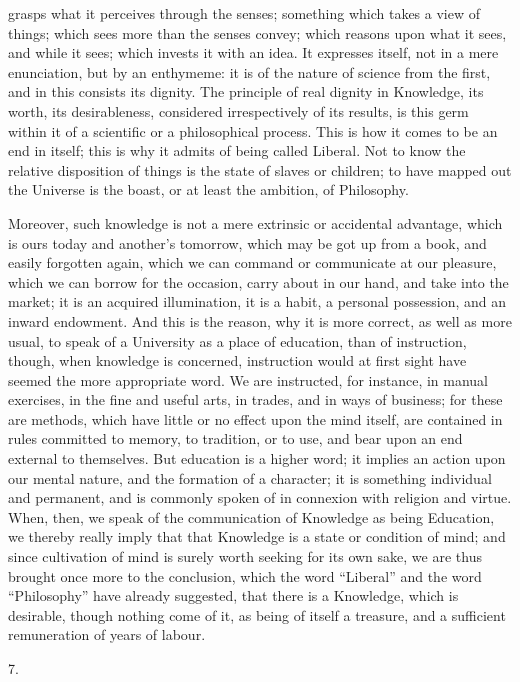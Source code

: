grasps what it perceives through the senses; something which takes a
view of things; which sees more than the senses convey; which reasons
upon what it sees, and while it sees; which invests it with an idea.
It expresses itself, not in a mere enunciation, but by an enthymeme:
it is of the nature of science from the first, and in this consists
its dignity. The principle of real dignity in Knowledge, its worth,
its desirableness, considered irrespectively of its results, is this
germ within it of a scientific or a philosophical process. This is how
it comes to be an end in itself; this is why it admits of being called
Liberal. Not to know the relative disposition of things is the state
of slaves or children; to have mapped out the Universe is the boast,
or at least the ambition, of Philosophy.

Moreover, such knowledge is not a mere extrinsic or accidental
advantage, which is ours today and another's tomorrow, which may be
got up from a book, and easily forgotten again, which we can command
or communicate at our pleasure, which we can borrow for the occasion,
carry about in our hand, and take into the market; it is an acquired
illumination, it is a habit, a personal possession, and an inward
endowment. And this is the reason, why it is more correct, as well as
more usual, to speak of a University as a place of education, than of
instruction, though, when knowledge is concerned, instruction would at
first sight have seemed the more appropriate word. We are instructed,
for instance, in manual exercises, in the fine and useful arts, in
trades, and in ways of business; for these are methods, which have
little or no effect upon the mind itself, are contained in rules
committed to memory, to tradition, or to use, and bear upon an
end external to themselves. But education is a higher word; it implies
an action upon our mental nature, and the formation of a character; it
is something individual and permanent, and is commonly spoken of in
connexion with religion and virtue. When, then, we speak of the
communication of Knowledge as being Education, we thereby really imply
that that Knowledge is a state or condition of mind; and since
cultivation of mind is surely worth seeking for its own sake, we are
thus brought once more to the conclusion, which the word
``Liberal'' and the word ``Philosophy'' have already
suggested, that there is a Knowledge, which is desirable, though
nothing come of it, as being of itself a treasure, and a sufficient
remuneration of years of labour.

7.

